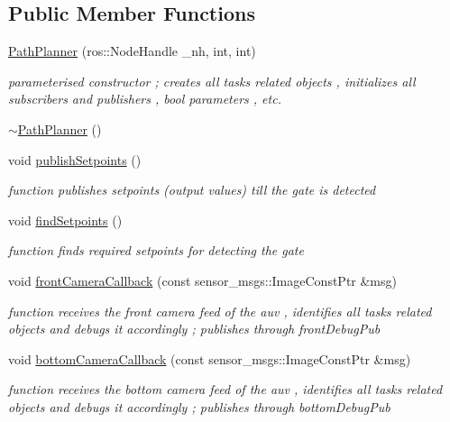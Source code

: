 \subsection*{Public Member Functions}
\begin{DoxyCompactItemize}
\item 
\hyperlink{classPathPlanner_a64afb30132b2f7079bc24bfc7c97810d}{Path\+Planner} (ros\+::\+Node\+Handle \+\_\+nh, int, int)
\begin{DoxyCompactList}\small\item\em parameterised constructor ; creates all tasks related objects , initializes all subscribers and publishers , bool parameters , etc. \end{DoxyCompactList}\item 
\hyperlink{classPathPlanner_a61bd61f848e519df56b75eddd3732ab8}{$\sim$\+Path\+Planner} ()
\item 
void \hyperlink{classPathPlanner_a9606656f6008c9915c351e87e3b3db1f}{publish\+Setpoints} ()
\begin{DoxyCompactList}\small\item\em function publishes setpoints (output values) till the gate is detected \end{DoxyCompactList}\item 
void \hyperlink{classPathPlanner_a67e0129f08f6df984e407992d3804890}{find\+Setpoints} ()
\begin{DoxyCompactList}\small\item\em function finds required setpoints for detecting the gate \end{DoxyCompactList}\item 
void \hyperlink{classPathPlanner_ada3d9b80cf5f40c329046ca149e8ba8f}{front\+Camera\+Callback} (const sensor\+\_\+msgs\+::\+Image\+Const\+Ptr \&msg)
\begin{DoxyCompactList}\small\item\em function receives the front camera feed of the auv , identifies all tasks related objects and debugs it accordingly ; publishes through front\+Debug\+Pub \end{DoxyCompactList}\item 
void \hyperlink{classPathPlanner_a9473e9625d617bd0c5b900245195feac}{bottom\+Camera\+Callback} (const sensor\+\_\+msgs\+::\+Image\+Const\+Ptr \&msg)
\begin{DoxyCompactList}\small\item\em function receives the bottom camera feed of the auv , identifies all tasks related objects and debugs it accordingly ; publishes through bottom\+Debug\+Pub \end{DoxyCompactList}\item 

\end{DoxyCompactItemize}
